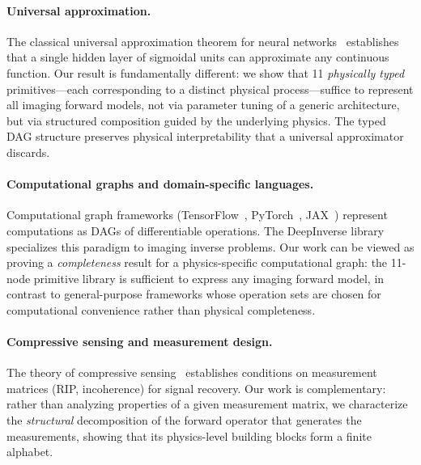 \documentclass[11pt]{article}
\begin{document}
\paragraph{Universal approximation.}
The classical universal approximation theorem for neural networks~\cite{cybenko1989approximation,hornik1991approximation} establishes that a single hidden layer of sigmoidal units can approximate any continuous function. Our result is fundamentally different: we show that 11 \emph{physically typed} primitives---each corresponding to a distinct physical process---suffice to represent all imaging forward models, not via parameter tuning of a generic architecture, but via structured composition guided by the underlying physics. The typed DAG structure preserves physical interpretability that a universal approximator discards.

\paragraph{Computational graphs and domain-specific languages.}
Computational graph frameworks (TensorFlow~\cite{abadi2016tensorflow}, PyTorch~\cite{paszke2019pytorch}, JAX~\cite{bradbury2018jax}) represent computations as DAGs of differentiable operations. The DeepInverse library~\cite{tachella2025deepinverse} specializes this paradigm to imaging inverse problems. Our work can be viewed as proving a \emph{completeness} result for a physics-specific computational graph: the 11-node primitive library is sufficient to express any imaging forward model, in contrast to general-purpose frameworks whose operation sets are chosen for computational convenience rather than physical completeness.

\paragraph{Compressive sensing and measurement design.}
The theory of compressive sensing~\cite{candes2008compressed,donoho2006compressed} establishes conditions on measurement matrices (RIP, incoherence) for signal recovery. Our work is complementary: rather than analyzing properties of a given measurement matrix, we characterize the \emph{structural} decomposition of the forward operator that generates the measurements, showing that its physics-level building blocks form a finite alphabet.


\end{document}
